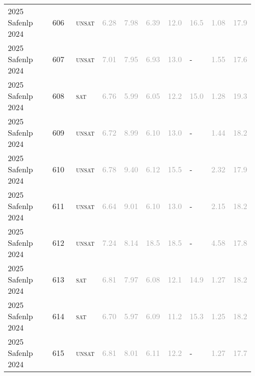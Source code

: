 \begin{center}
{\begin{longtable}{@{}llllllllll@{}}
2025 Safenlp 2024 & 606 & ~\textsc{unsat} & \textcolor{darkgray}{6.28} & \textcolor{darkgray}{7.98} & \textcolor{darkgray}{6.39} & \textcolor{darkgray}{12.0} & \textcolor{darkgray}{16.5} & \textcolor{darkgray}{1.08} & \textcolor{darkgray}{17.9} \\
2025 Safenlp 2024 & 607 & ~\textsc{unsat} & \textcolor{darkgray}{7.01} & \textcolor{darkgray}{7.95} & \textcolor{darkgray}{6.93} & \textcolor{darkgray}{13.0} & - & \textcolor{darkgray}{1.55} & \textcolor{darkgray}{17.6} \\
2025 Safenlp 2024 & 608 & ~\textsc{sat} & \textcolor{darkgray}{6.76} & \textcolor{darkgray}{5.99} & \textcolor{darkgray}{6.05} & \textcolor{darkgray}{12.2} & \textcolor{darkgray}{15.0} & \textcolor{darkgray}{1.28} & \textcolor{darkgray}{19.3} \\
2025 Safenlp 2024 & 609 & ~\textsc{unsat} & \textcolor{darkgray}{6.72} & \textcolor{darkgray}{8.99} & \textcolor{darkgray}{6.10} & \textcolor{darkgray}{13.0} & - & \textcolor{darkgray}{1.44} & \textcolor{darkgray}{18.2} \\
2025 Safenlp 2024 & 610 & ~\textsc{unsat} & \textcolor{darkgray}{6.78} & \textcolor{darkgray}{9.40} & \textcolor{darkgray}{6.12} & \textcolor{darkgray}{15.5} & - & \textcolor{darkgray}{2.32} & \textcolor{darkgray}{17.9} \\
2025 Safenlp 2024 & 611 & ~\textsc{unsat} & \textcolor{darkgray}{6.64} & \textcolor{darkgray}{9.01} & \textcolor{darkgray}{6.10} & \textcolor{darkgray}{13.0} & - & \textcolor{darkgray}{2.15} & \textcolor{darkgray}{18.2} \\
2025 Safenlp 2024 & 612 & ~\textsc{unsat} & \textcolor{darkgray}{7.24} & \textcolor{darkgray}{8.14} & \textcolor{darkgray}{18.5} & \textcolor{darkgray}{18.5} & - & \textcolor{darkgray}{4.58} & \textcolor{darkgray}{17.8} \\
2025 Safenlp 2024 & 613 & ~\textsc{sat} & \textcolor{darkgray}{6.81} & \textcolor{darkgray}{7.97} & \textcolor{darkgray}{6.08} & \textcolor{darkgray}{12.1} & \textcolor{darkgray}{14.9} & \textcolor{darkgray}{1.27} & \textcolor{darkgray}{18.2} \\
2025 Safenlp 2024 & 614 & ~\textsc{sat} & \textcolor{darkgray}{6.70} & \textcolor{darkgray}{5.97} & \textcolor{darkgray}{6.09} & \textcolor{darkgray}{11.2} & \textcolor{darkgray}{15.3} & \textcolor{darkgray}{1.25} & \textcolor{darkgray}{18.2} \\
2025 Safenlp 2024 & 615 & ~\textsc{unsat} & \textcolor{darkgray}{6.81} & \textcolor{darkgray}{8.01} & \textcolor{darkgray}{6.11} & \textcolor{darkgray}{12.2} & - & \textcolor{darkgray}{1.27} & \textcolor{darkgray}{17.7} \\

\end{longtable}}
\end{center}
